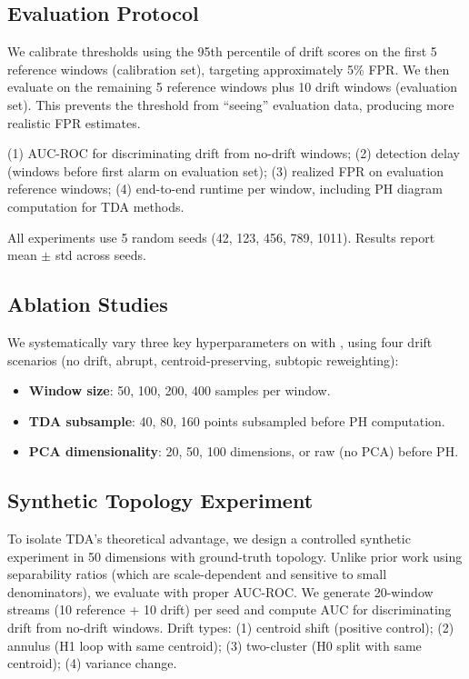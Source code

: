 \subsection{Evaluation Protocol}
\label{sec:eval}

We calibrate thresholds using the 95th percentile of drift scores on the first 5 reference windows (calibration set), targeting approximately 5\% FPR. We then evaluate on the remaining 5 reference windows plus 10 drift windows (evaluation set). This prevents the threshold from ``seeing'' evaluation data, producing more realistic FPR estimates.

(1) AUC-ROC for discriminating drift from no-drift windows; (2) detection delay (windows before first alarm on evaluation set); (3) realized FPR on evaluation reference windows; (4) end-to-end runtime per window, including PH diagram computation for TDA methods.

All experiments use 5 random seeds (42, 123, 456, 789, 1011). Results report mean $\pm$ std across seeds.

\subsection{Ablation Studies}
\label{sec:ablations}

We systematically vary three key hyperparameters on \agnews with \minilm, using four drift scenarios (no drift, abrupt, centroid-preserving, subtopic reweighting):

\begin{itemize}[leftmargin=*,itemsep=2pt,topsep=2pt]
    \item \textbf{Window size}: 50, 100, 200, 400 samples per window.
    \item \textbf{TDA subsample}: 40, 80, 160 points subsampled before PH computation.
    \item \textbf{PCA dimensionality}: 20, 50, 100 dimensions, or raw (no PCA) before PH.
\end{itemize}

\subsection{Synthetic Topology Experiment}
\label{sec:synthetic}

To isolate TDA's theoretical advantage, we design a controlled synthetic experiment in 50 dimensions with ground-truth topology. Unlike prior work using separability ratios (which are scale-dependent and sensitive to small denominators), we evaluate with proper AUC-ROC. We generate 20-window streams (10 reference + 10 drift) per seed and compute AUC for discriminating drift from no-drift windows. Drift types: (1) centroid shift (positive control); (2) annulus (H1 loop with same centroid); (3) two-cluster (H0 split with same centroid); (4) variance change.

